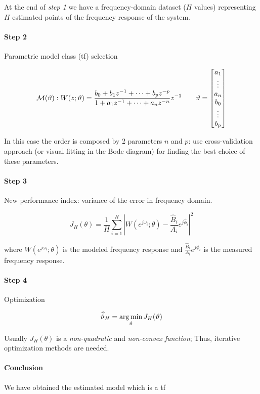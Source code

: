 At the end of \emph{step 1} we have a frequency-domain dataset ($H$ values) representing $H$ estimated points of the frequency response of the system.

\paragraph{Step 2} Parametric model class (\gls{tf}) selection

\[
    \mathcal{M}(\vartheta): W(z; \vartheta) = \frac{b_0+b_1z^{-1}+\cdots+b_pz^{-p}}{1+a_1z^{-1}+\cdots+a_nz^{-n}}z^{-1}
    \qquad
    \vartheta = \begin{bmatrix}
        a_1 \\ \vdots \\ a_n \\ b_0 \\ \vdots \\ b_p
    \end{bmatrix}
\]

\begin{obs}
    In this case the order is composed by 2 parameters $n$ and $p$:
    use cross-validation approach (or visual fitting in the Bode diagram) for finding the best choice of these parameters.
\end{obs}

\paragraph{Step 3} New performance index: variance of the error in frequency domain.

\[
    J_H(\theta) = \frac{1}{H} \sum_{i=1}^H \left | W(e^{j\omega_i}; \theta) - \frac{\hat{B}_i}{A_i}e^{j\hat{\phi}_i} \right | ^2
\]

where $W(e^{j\omega_i}; \theta)$ is the modeled frequency response and $\frac{\hat{B}_i}{A_i}e^{j\hat{\phi}_i}$ is the measured frequency response.

\paragraph{Step 4} Optimization

\[
    \widehat{\vartheta}_H = \operatorname*{arg\,min}_\vartheta J_H(\vartheta)
\]

Usually $J_H(\theta)$ is a \emph{non-quadratic} and \emph{non-convex function}; Thus, iterative optimization methods are needed.

\paragraph{Conclusion} We have obtained the estimated model which is a \gls{tf}

